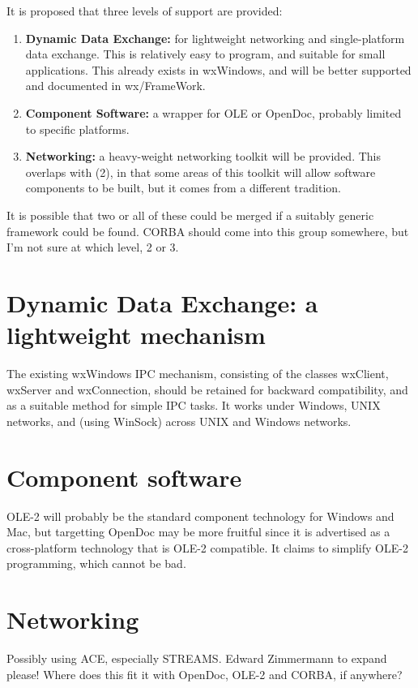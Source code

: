 It is proposed that three levels of support are provided:

\begin{enumerate}
\item {\bf Dynamic Data Exchange:} for lightweight networking and
single-platform data exchange. This is relatively easy to program, and
suitable for small applications. This already exists in wxWindows, and
will be better supported and documented in wx/FrameWork.
\item {\bf Component Software:} a wrapper for OLE or OpenDoc, probably limited
to specific platforms.
\item {\bf Networking:} a heavy-weight networking toolkit will be provided.
This overlaps with (2), in that some areas of this toolkit will allow
software components to be built, but it comes from a different tradition.
\end{enumerate}

It is possible that two or all of these could be merged if a suitably
generic framework could be found. CORBA should come into this group
somewhere, but I'm not sure at which level, 2 or 3.

\section{Dynamic Data Exchange: a lightweight mechanism}

The existing wxWindows IPC mechanism, consisting of the classes wxClient,
wxServer and wxConnection, should be retained for backward compatibility,
and as a suitable method for simple IPC tasks. It works under Windows,
UNIX networks, and (using WinSock) across UNIX and Windows networks.

\section{Component software}

OLE-2 will probably be the standard component technology for Windows
and Mac, but targetting OpenDoc may be more fruitful since it is
advertised as a cross-platform technology that is OLE-2 compatible. It
claims to simplify OLE-2 programming, which cannot be bad.

\section{Networking}

Possibly using ACE, especially STREAMS. Edward Zimmermann to expand
please! Where does this fit it with OpenDoc, OLE-2 and CORBA, if
anywhere?

